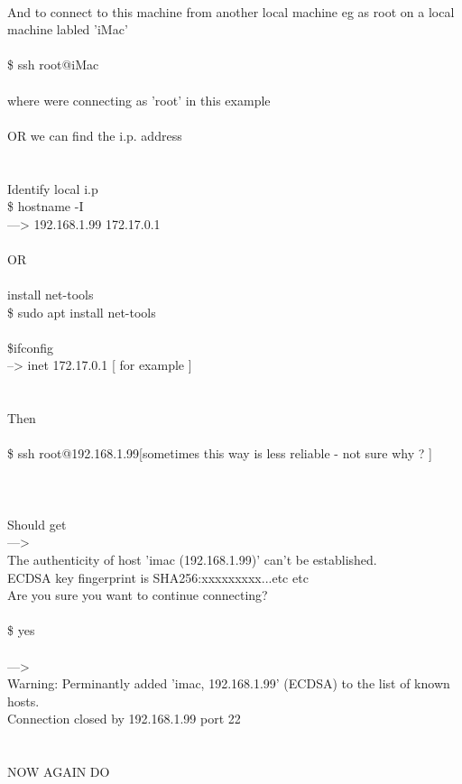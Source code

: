 \documentclass[10pt,a4paper]{article}
\begin{document}
{{{{{{{{{{{{{{{{{{{{{{\\
And to connect to this machine from another local machine eg as root on a local machine labled 'iMac'\\
\\
\$ ssh root@iMac\\
\\
	where were connecting as 'root' in this example\\
\\
OR we can find the i.p. address\\
\\
\\
Identify local i.p\\
\$ hostname -I\\
--->  192.168.1.99 172.17.0.1\\
\\
OR\\
\\
install net-tools\\
	\$ sudo apt install net-tools\\
\\
	\$ifconfig \\
 	--> inet 172.17.0.1   [ for example ]\\
\\
\\
Then\\
\\
\$ ssh root@192.168.1.99}{\large    [sometimes this way is less reliable - not sure why ? ]\\
\\
\\
\\
Should get\\
 --->\\
The authenticity of host 'imac (192.168.1.99)' can't be established.\\
ECDSA key fingerprint is SHA256:xxxxxxxxx...etc etc\\
Are you sure you want to continue connecting?\\
\\
\$ yes\\
\\
--->\\
Warning: Perminantly added 'imac, 192.168.1.99' (ECDSA) to the list of known hosts.\\
Connection closed by 192.168.1.99 port 22\\
\\
\\
NOW AGAIN DO\\
}}}}}}}}}}}}}}}}}}}}}}
\end{document}
